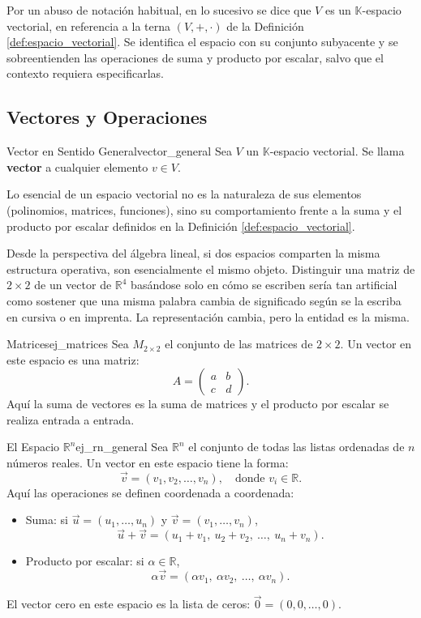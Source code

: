 \documentclass[11pt, a4paper]{article}
\begin{document}
\obs Por un abuso de notación habitual, en lo sucesivo se dice que $V$ es un $\mathbb{K}$-espacio vectorial, en referencia a la terna $(V, +, \cdot)$ de la Definición \ref{def:espacio_vectorial}. Se identifica el espacio con su conjunto subyacente y se sobreentienden las operaciones de suma y producto por escalar, salvo que el contexto requiera especificarlas.

\subsection{Vectores y Operaciones}

\begin{definicion}{Vector en Sentido General}{vector_general}
Sea $V$ un $\mathbb{K}$-espacio vectorial. Se llama \textbf{vector} a cualquier elemento $v \in V$.
\end{definicion}

\obs Lo esencial de un espacio vectorial no es la naturaleza de sus elementos (polinomios, matrices, funciones), sino su comportamiento frente a la suma y el producto por escalar definidos en la Definición \ref{def:espacio_vectorial}.

Desde la perspectiva del álgebra lineal, si dos espacios comparten la misma estructura operativa, son esencialmente el mismo objeto. Distinguir una matriz de $2\times 2$ de un vector de $\mathbb{R}^4$ basándose solo en cómo se escriben sería tan artificial como sostener que una misma palabra cambia de significado según se la escriba en cursiva o en imprenta. La representación cambia, pero la entidad es la misma.

\begin{ejemplo}{Matrices}{ej_matrices}
Sea $M_{2\times 2}$ el conjunto de las matrices de $2 \times 2$. Un vector en este espacio es una matriz:
\[
A = \begin{pmatrix} a & b \\ c & d \end{pmatrix}.
\]
Aquí la suma de vectores es la suma de matrices y el producto por escalar se realiza entrada a entrada.
\end{ejemplo}

\begin{ejemplo}{El Espacio $\mathbb{R}^n$}{ej_rn_general}
Sea $\mathbb{R}^n$ el conjunto de todas las listas ordenadas de $n$ números reales.
Un vector en este espacio tiene la forma:
\[
\vec{v} = (v_1, v_2, \dots, v_n), \quad \text{donde } v_i \in \mathbb{R}.
\]
Aquí las operaciones se definen coordenada a coordenada:
\begin{itemize}
    \item Suma: si $\vec{u} = (u_1, \dots, u_n)$ y $\vec{v} = (v_1, \dots, v_n)$,
    \[
    \vec{u} + \vec{v} = (u_1 + v_1, \ u_2 + v_2, \ \dots, \ u_n + v_n).
    \]
    \item Producto por escalar: si $\alpha \in \mathbb{R}$,
    \[
    \alpha \vec{v} = (\alpha v_1, \ \alpha v_2, \ \dots, \ \alpha v_n).
    \]
\end{itemize}
El vector cero en este espacio es la lista de ceros: $\vec{0} = (0, 0, \dots, 0)$.
\end{ejemplo}
\end{document}
